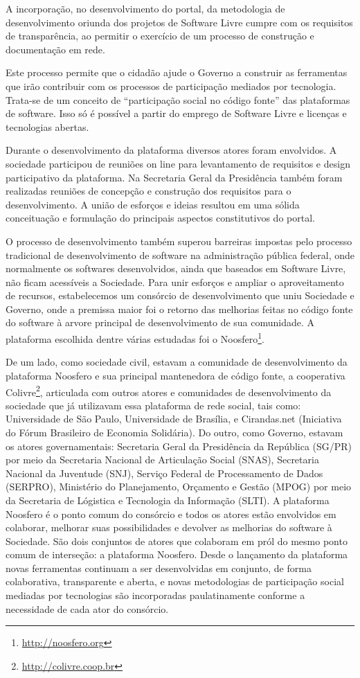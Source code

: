 \documentclass{article}
\begin{document}
A incorporação, no desenvolvimento do portal, da metodologia de desenvolvimento
oriunda dos projetos de Software Livre cumpre com os requisitos de
transparência, ao permitir o exercício de um processo de construção e
documentação em rede. 

Este processo permite que o cidadão ajude o Governo a construir as ferramentas
que irão contribuir com os processos de participação mediados por tecnologia.
Trata-se de um conceito de ``participação social no código fonte'' das
plataformas de software. Isso só é possível a partir do emprego de Software
Livre e licenças e tecnologias abertas. 

Durante o desenvolvimento da plataforma diversos atores foram envolvidos. A
sociedade participou de reuniões on line para levantamento de requisitos e
design participativo da plataforma. Na Secretaria Geral da Presidência também
foram realizadas reuniões de concepção e construção dos requisitos para o
desenvolvimento. A união de esforços e ideias resultou em uma sólida
conceituação e formulação do principais aspectos constitutivos do portal.

O processo de desenvolvimento também superou barreiras impostas pelo processo
tradicional de desenvolvimento de software na administração pública federal,
onde normalmente os softwares desenvolvidos, ainda que baseados em Software
Livre, não ficam acessíveis a Sociedade. Para unir esforços e ampliar o
aproveitamento de recursos, estabelecemos um consórcio de desenvolvimento que
uniu Sociedade e Governo, onde a premissa maior foi o retorno das melhorias
feitas no código fonte do software à arvore principal de desenvolvimento de sua
comunidade. A plataforma escolhida dentre várias estudadas foi o Noosfero\footnote{\url{http://noosfero.org}}.

De um lado, como sociedade civil, estavam a comunidade de desenvolvimento da
plataforma Noosfero e sua principal mantenedora de código fonte, a cooperativa Colivre\footnote{\url{http://colivre.coop.br}},
articulada com outros atores e comunidades de desenvolvimento da sociedade que
já utilizavam essa plataforma de rede social, tais como: Universidade de São
Paulo, Universidade de Brasília, e Cirandas.net (Iniciativa do Fórum Brasileiro
de Economia Solidária). Do outro, como Governo, estavam os atores
governamentais: Secretaria Geral da Presidência da República (SG/PR) por meio
da Secretaria Nacional de Articulação Social (SNAS), Secretaria Nacional da
Juventude (SNJ), Serviço Federal de Processamento de Dados (SERPRO), Ministério
do Planejamento, Orçamento e Gestão (MPOG) por meio da Secretaria de Lógistica
e Tecnologia da Informação (SLTI). A plataforma Noosfero é o ponto comum do
consórcio e todos os atores estão envolvidos em colaborar, melhorar suas
possibilidades e devolver as melhorias do software à Sociedade. São dois
conjuntos de atores que colaboram em pról do mesmo ponto comum de interseção: a
plataforma Noosfero. Desde o lançamento da plataforma novas ferramentas
continuam a ser desenvolvidas em conjunto, de forma colaborativa, transparente
e aberta, e novas metodologias de participação social mediadas por tecnologias
são incorporadas paulatinamente conforme a necessidade de cada ator do
consórcio.
\end{document}

